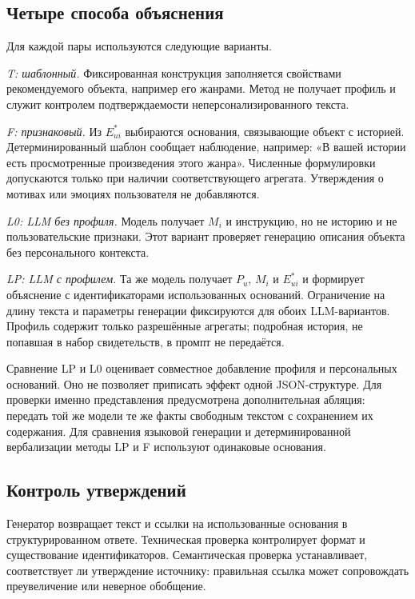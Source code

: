 \documentclass{misisarticle}
\begin{document}
\subsection{Четыре способа объяснения}

Для каждой пары используются следующие варианты.

\textit{T: шаблонный.} Фиксированная конструкция заполняется свойствами рекомендуемого объекта, например его жанрами. Метод не получает профиль и служит контролем подтверждаемости неперсонализированного текста.

\textit{F: признаковый.} Из $E^*_{ui}$ выбираются основания, связывающие объект с историей. Детерминированный шаблон сообщает наблюдение, например: «В вашей истории есть просмотренные произведения этого жанра». Численные формулировки допускаются только при наличии соответствующего агрегата. Утверждения о мотивах или эмоциях пользователя не добавляются.

\textit{L0: LLM без профиля.} Модель получает $M_i$ и инструкцию, но не историю и не пользовательские признаки. Этот вариант проверяет генерацию описания объекта без персонального контекста.

\textit{LP: LLM с профилем.} Та же модель получает $P_u$, $M_i$ и $E^*_{ui}$ и формирует объяснение с идентификаторами использованных оснований. Ограничение на длину текста и параметры генерации фиксируются для обоих LLM-вариантов. Профиль содержит только разрешённые агрегаты; подробная история, не попавшая в набор свидетельств, в промпт не передаётся.

Сравнение LP и L0 оценивает совместное добавление профиля и персональных оснований. Оно не позволяет приписать эффект одной JSON-структуре. Для проверки именно представления предусмотрена дополнительная абляция: передать той же модели те же факты свободным текстом с сохранением их содержания. Для сравнения языковой генерации и детерминированной вербализации методы LP и F используют одинаковые основания.

\subsection{Контроль утверждений}

Генератор возвращает текст и ссылки на использованные основания в структурированном ответе. Техническая проверка контролирует формат и существование идентификаторов. Семантическая проверка устанавливает, соответствует ли утверждение источнику: правильная ссылка может сопровождать преувеличение или неверное обобщение.
\end{document}
